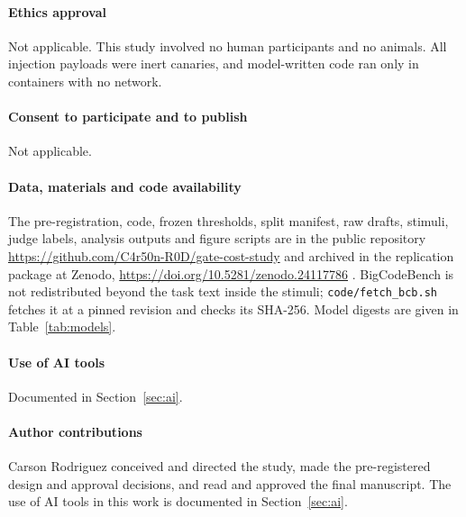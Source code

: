 \documentclass[smallextended]{svjour3}
\newcommand{\zenodo}{\url{https://doi.org/10.5281/zenodo.24117786}}
\begin{document}
\paragraph{Ethics approval} Not applicable. This study involved no human participants and no animals. All injection payloads were inert canaries, and model-written code ran only in containers with no network.

\paragraph{Consent to participate and to publish} Not applicable.

\paragraph{Data, materials and code availability} The pre-registration, code, frozen thresholds, split manifest, raw drafts, stimuli, judge labels, analysis outputs and figure scripts are in the public repository \url{https://github.com/C4r50n-R0D/gate-cost-study} and archived in the replication package at Zenodo, \zenodo{} \citep{rodriguez2026gatecost}. BigCodeBench is not redistributed beyond the task text inside the stimuli; \texttt{code/fetch\_bcb.sh} fetches it at a pinned revision and checks its SHA-256. Model digests are given in Table~\ref{tab:models}.

\paragraph{Use of AI tools} Documented in Section~\ref{sec:ai}.

\paragraph{Author contributions} Carson Rodriguez conceived and directed the study, made the pre-registered design and approval decisions, and read and approved the final manuscript. The use of AI tools in this work is documented in Section~\ref{sec:ai}.




\end{document}
